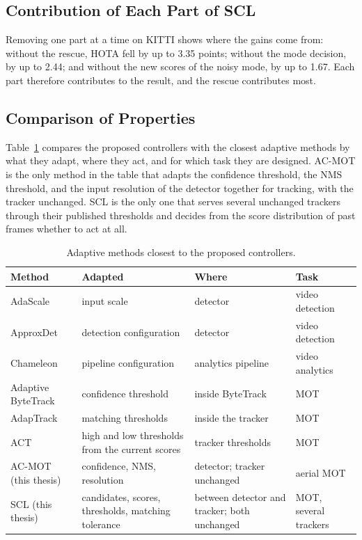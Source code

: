 \subsection{Contribution of Each Part of SCL}\label{sec:res-parts}
Removing one part at a time on KITTI shows where the gains come from: without the rescue, HOTA fell by up to 3.35 points; without the mode decision, by up to 2.44; and without the new scores of the noisy mode, by up to 1.67. Each part therefore contributes to the result, and the rescue contributes most.

\subsection{Comparison of Properties}\label{sec:res-properties}
Table~\ref{tab:res-properties} compares the proposed controllers with the closest adaptive methods by what they adapt, where they act, and for which task they are designed. AC-MOT is the only method in the table that adapts the confidence threshold, the NMS threshold, and the input resolution of the detector together for tracking, with the tracker unchanged. SCL is the only one that serves several unchanged trackers through their published thresholds and decides from the score distribution of past frames whether to act at all.

\begin{table}[tbp]
\centering
\caption{Adaptive methods closest to the proposed controllers.}
\label{tab:res-properties}
\begin{tabular}{>{\raggedright\arraybackslash}p{3.4cm}>{\raggedright\arraybackslash}p{4.2cm}>{\raggedright\arraybackslash}p{3.9cm}>{\raggedright\arraybackslash}p{2.9cm}}
\toprule
Method & Adapted & Where & Task\\
\midrule
AdaScale \cite{chin2019adascale} & input scale & detector & video detection\\
ApproxDet \cite{xu2020approxdet} & detection configuration & detector & video detection\\
Chameleon \cite{jiang2018chameleon} & pipeline configuration & analytics pipeline & video analytics\\
Adaptive ByteTrack \cite{ma2023adaptivebytetrack} & confidence threshold & inside ByteTrack & MOT\\
AdapTrack \cite{shim2024adaptrack} & matching thresholds & inside the tracker & MOT\\
ACT \cite{act2026adaptive} & high and low thresholds from the current scores & tracker thresholds & MOT\\
AC-MOT (this thesis) & confidence, NMS, resolution & detector; tracker unchanged & aerial MOT\\
SCL (this thesis) & candidates, scores, thresholds, matching tolerance & between detector and tracker; both unchanged & MOT, several trackers\\
\bottomrule
\end{tabular}
\end{table}

